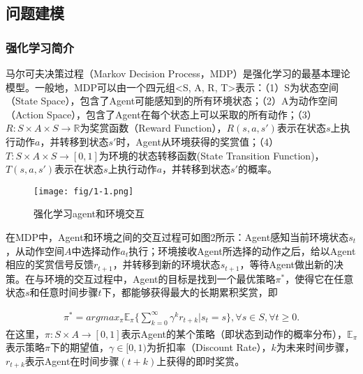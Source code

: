 \subsection{问题建模}

\subsubsection{强化学习简介}

马尔可夫决策过程（Markov Decision Process，MDP）是强化学习的最基本理论模型。一般地，MDP可以由一个四元组<S, A, R, T>表示：（1）S为状态空间（State Space），包含了Agent可能感知到的所有环境状态；（2）A为动作空间（Action Space），包含了Agent在每个状态上可以采取的所有动作；（3）$R: S \times A \times S \rightarrow \mathbb{R}$为奖赏函数（Reward Function），$R(s,a,s')$表示在状态$s$上执行动作$a$，并转移到状态$s'$时，Agent从环境获得的奖赏值；（4）$T: S \times A \times S \rightarrow [0,1]$为环境的状态转移函数(State Transition Function)，$T(s,a,s')$表示在状态$s$上执行动作$a$，并转移到状态$s'$的概率。

\begin{figure}[!h]
\centering
\texttt{[image: fig/1-1.png]}
\caption{强化学习agent和环境交互}
\end{figure}

在MDP中，Agent和环境之间的交互过程可如图2所示：Agent感知当前环境状态$s_t$，从动作空间$A$中选择动作$a_t$执行；环境接收Agent所选择的动作之后，给以Agent相应的奖赏信号反馈$r_{t+1}$，并转移到新的环境状态$s_{t+1}$，等待Agent做出新的决策。在与环境的交互过程中，Agent的目标是找到一个最优策略${\pi}^*$，使得它在任意状态$s$和任意时间步骤$t$下，都能够获得最大的长期累积奖赏，即

\begin{align}
 {\pi}^* = argmax_{\pi} \mathbb{E}_{\pi} \{ \sum_{k=0}^{\infty} \gamma^k r_{t+k} | s_t = s \}, \forall s \in S, \forall t \geq 0. 
\end{align}
在这里，$\pi: S \times A \rightarrow [0,1]$表示Agent的某个策略（即状态到动作的概率分布），$\mathbb{E}_{\pi}$表示策略$\pi$下的期望值，$\gamma \in [0,1)$为折扣率（Discount Rate），$k$为未来时间步骤，$r_{t+k}$表示Agent在时间步骤$(t+k)$上获得的即时奖赏。

